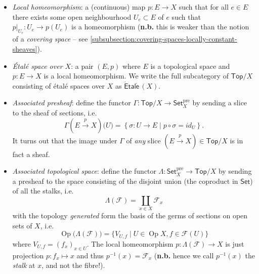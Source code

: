 \documentclass[10pt]{article}
\DeclareMathOperator{\Op}{Op}
\newcommand{\Set}{\mathsf{Set}}
\newcommand{\Top}{\mathsf{Top}}
\newcommand{\Etale}{\mathsf{\acute{E}tal\acute{e}}\,}
\newcommand{\fsheaf}{\mathcal{F}}
\newcommand{\pre}{\text{pre}}
\begin{document}
                \begin{itemize}
                    \item \textit{Local homeomorphism}: a (continuous) map $p\colon E\to X$ such that for all $e\in E$ there exists some open neighbourhood $U_e\subset E$ of $e$ such that $p|_{U_e}\colon U_e\to p(U_e)$ is a homeomorphism
                        (\textbf{n.b.}  this is weaker than the notion of a \textit{covering space} – see \cref{subsubsection:covering-spaces-locally-constant-sheaves}).
                    \item \textit{Étalé space over $X$}: a pair $(E,p)$ where $E$ is a topological space and $p\colon E\to X$ is a local homeomorphism.
                        We write the full subcategory of $\Top/X$ consisting of étalé spaces over $X$ as $\Etale(X)$.
                    \item \textit{Associated presheaf}: define the functor $\Gamma\colon\Top/X\to\Set_X^\pre$ by sending a slice to the sheaf of sections, i.e.
                        \begin{equation*}
                            \Gamma\left(E\xrightarrow{p}X\right)\big(U\big) = \left\{\sigma\colon U\to E \mid p\circ\sigma =
                            id_U\right\}.
                        \end{equation*}
                        It turns out that the image under $\Gamma$ of \textit{any} slice $(E\xrightarrow{p}X)\in\Top/X$ is in fact a sheaf.
                    \item \textit{Associated topological space}: define the functor $\Lambda\colon\Set_X^\pre\to\Top/X$ by sending a presheaf to the space consisting of the disjoint union (the coproduct in $\Set$) of all the stalks, i.e.
                        \begin{equation*}
                            \Lambda(\fsheaf) = \coprod_{x\in X}\fsheaf_x
                        \end{equation*}
                        with the topology \textit{generated} form the basis of the germs of sections on open sets of $X$, i.e.
                        \begin{equation*}
                            \Op\big(\Lambda(\fsheaf)\big) = \{V_{U,f} \mid U\in\Op X, f\in\fsheaf(U)\}
                        \end{equation*}
                        where $V_{U,f} = (f_x)_{x\in U}$.
                        The local homeomorphism $p\colon\Lambda(\fsheaf)\to X$ is just projection \mbox{$p\colon f_x\mapsto x$} and thus $p^{-1}(x)=\fsheaf_x$ (\textbf{n.b.} hence we call $p^{-1}(x)$ the \textit{stalk} at $x$, and not the fibre!).
                        

\end{itemize}
\end{document}
